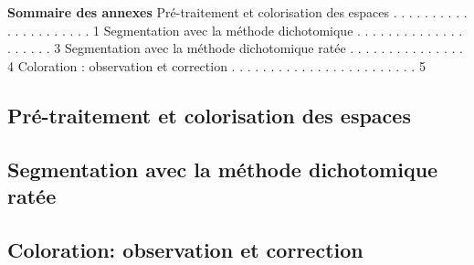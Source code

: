 \documentclass[12pt,a4paper]{article}
\begin{document}
\newpage
\pagestyle{fancy}
\textbf{\fontsize{20}{50}\selectfont Sommaire des annexes \large}\bigbreak
Pré-traitement et colorisation des espaces . . . . . . . . . . . . . . . . . . . . . 1 \bigbreak
Segmentation avec la méthode dichotomique . . . . . . . . . . . . . . . . . . . . 3 \bigbreak
Segmentation avec la méthode dichotomique ratée . . . . . . . . . . . . . . . 4 \bigbreak
Coloration : observation et correction . . . . . . . . . . . . . . . . . . . . . . . . 5 \bigbreak

\newpage
{}
\subsection*{Pré-traitement et colorisation des espaces}






\newpage
\subsection*{Segmentation avec la méthode dichotomique ratée}


\newpage
\subsection*{Coloration: observation et correction}
\end{document}
